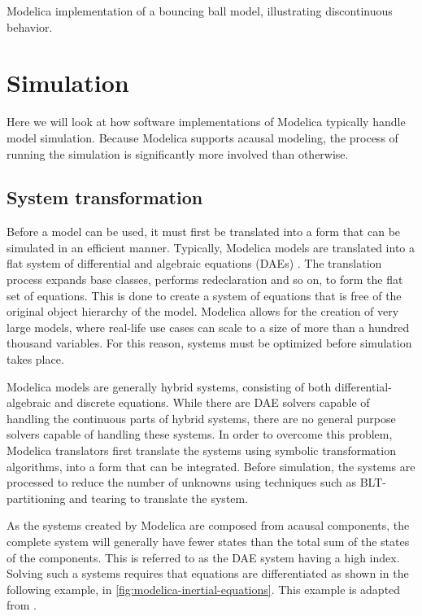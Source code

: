 \documentclass[\rootfolder/main.tex]{subfiles}
\begin{document}
\begin{listing}[ht]
    \inputminted{Modelica}{\rootfolder/Models/MasterProject/Models/BouncingBall.mo}
    \caption{Modelica implementation of a bouncing ball model, illustrating discontinuous behavior.\label{lst:modelica-discontinuous}}
\end{listing}

\section{Simulation}

Here we will look at how software implementations of Modelica typically handle model simulation.
Because Modelica supports acausal modeling, the process of running the simulation is significantly more involved than otherwise.

\subsection{System transformation}

Before a model can be used, it must first be translated into a form that can be simulated in an efficient manner.
Typically, Modelica models are translated into a flat system of differential and algebraic equations (DAEs) \cite{openmodelica.org:lundvall:sims:2005}.
The translation process expands base classes, performs redeclaration and so on, to form the flat set of equations.
This is done to create a system of equations that is free of the original object hierarchy of the model.
Modelica allows for the creation of very large models, where real-life use cases can scale to a size of more than a hundred thousand variables.
For this reason, systems must be optimized before simulation takes place.

Modelica models are generally hybrid systems, consisting of both differential-algebraic and discrete equations.
While there are DAE solvers capable of handling the continuous parts of hybrid systems, there are no general purpose solvers capable of handling these systems.
In order to overcome this problem, Modelica translators first translate the systems using symbolic transformation algorithms, into a form that can be integrated.
Before simulation, the systems are processed to reduce the number of unknowns using techniques such as BLT-partitioning and tearing \cite{clauss2002} to translate the system.

As the systems created by Modelica are composed from acausal components, the complete system will generally have fewer states than the total sum of the states of the components.
This is referred to as the DAE system having a high index.
Solving such a systems requires that equations are differentiated as shown in the following example, in \cref{fig:modelica-inertial-equations}.
This example is adapted from \cite{clauss2002}.
\end{document}

